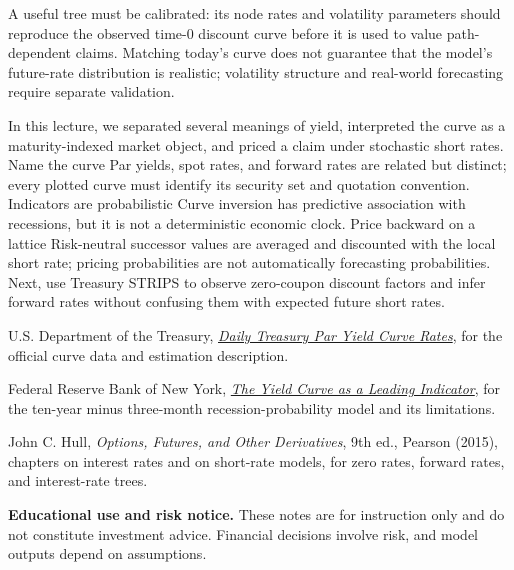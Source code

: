 \documentclass[11pt]{article}
\begin{document}
A useful tree must be calibrated: its node rates and volatility parameters should reproduce the observed time-0 discount curve before it is used to value path-dependent claims. Matching today's curve does not guarantee that the model's future-rate distribution is realistic; volatility structure and real-world forecasting require separate validation.

\newpage
\thispagestyle{fancy}
\keytakeaways
  {In this lecture, we separated several meanings of yield, interpreted the curve as a maturity-indexed market object, and priced a claim under stochastic short rates.}
  {Name the curve}
  {Par yields, spot rates, and forward rates are related but distinct; every plotted curve must identify its security set and quotation convention.}
  {Indicators are probabilistic}
  {Curve inversion has predictive association with recessions, but it is not a deterministic economic clock.}
  {Price backward on a lattice}
  {Risk-neutral successor values are averaged and discounted with the local short rate; pricing probabilities are not automatically forecasting probabilities.}
  {Next, use Treasury STRIPS to observe zero-coupon discount factors and infer forward rates without confusing them with expected future short rates.}

\begin{readinglist}
  \item U.S. Department of the Treasury, \href{https://home.treasury.gov/resource-center/data-chart-center/interest-rates/TextView?type=daily_treasury_yield_curve}{\emph{Daily Treasury Par Yield Curve Rates}}, for the official curve data and estimation description.
  \item Federal Reserve Bank of New York, \href{https://www.newyorkfed.org/research/capital_markets/ycfaq.htm}{\emph{The Yield Curve as a Leading Indicator}}, for the ten-year minus three-month recession-probability model and its limitations.
  \item John C. Hull, \emph{Options, Futures, and Other Derivatives}, 9th ed., Pearson (2015), chapters on interest rates and on short-rate models, for zero rates, forward rates, and interest-rate trees.
\end{readinglist}

\vfill
{\sffamily\footnotesize\color{vnmuted}\textbf{Educational use and risk notice.} These notes are for instruction only and do not constitute investment advice. Financial decisions involve risk, and model outputs depend on assumptions.}
\end{document}
